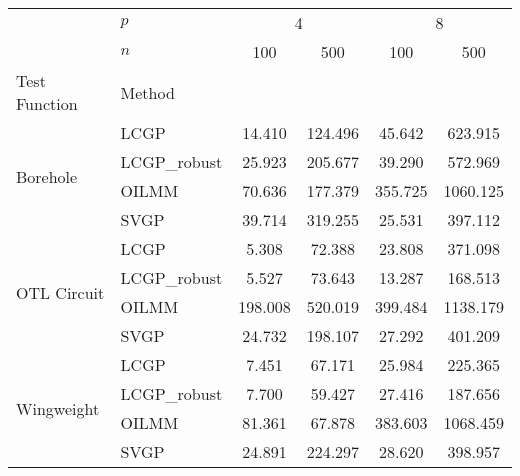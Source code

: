 \begin{tabular}{llcccc}
\hline
 &  $p$  & \multicolumn{2}{c}{4} & \multicolumn{2}{c}{8} \\
 & $n$ & 100 & 500 & 100 & 500 \\
Test Function &  Method  &  &  &  &  \\
\hline
\hline\multirow[c]{4}{*}{Borehole} & LCGP & 14.410 & 124.496 & 45.642 & 623.915 \\
 & LCGP\_robust & 25.923 & 205.677 & 39.290 & 572.969 \\
 & OILMM & 70.636 & 177.379 & 355.725 & 1060.125 \\
 & SVGP & 39.714 & 319.255 & 25.531 & 397.112 \\
\hline\multirow[c]{4}{*}{OTL Circuit} & LCGP & 5.308 & 72.388 & 23.808 & 371.098 \\
 & LCGP\_robust & 5.527 & 73.643 & 13.287 & 168.513 \\
 & OILMM & 198.008 & 520.019 & 399.484 & 1138.179 \\
 & SVGP & 24.732 & 198.107 & 27.292 & 401.209 \\
\hline\multirow[c]{4}{*}{Wingweight} & LCGP & 7.451 & 67.171 & 25.984 & 225.365 \\
 & LCGP\_robust & 7.700 & 59.427 & 27.416 & 187.656 \\
 & OILMM & 81.361 & 67.878 & 383.603 & 1068.459 \\
 & SVGP & 24.891 & 224.297 & 28.620 & 398.957 \\
\hline
\end{tabular}
